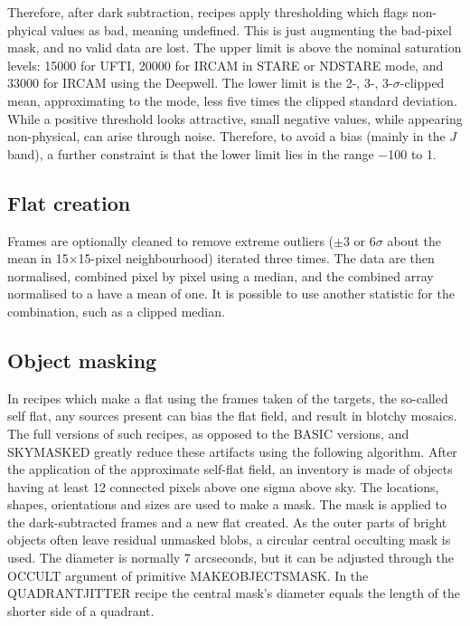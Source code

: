\documentclass[twoside,11pt]{article}
\newcommand{\xlabel}[1]{}
\renewcommand{\_}{\texttt{\symbol{95}}}
\begin{document}
Therefore, after dark subtraction, recipes apply thresholding which
flags non-phyical values as bad, meaning undefined.  This is
just augmenting the bad-pixel mask, and no valid data are lost.  The
upper limit is above the nominal saturation levels: 15000 for UFTI,
20000 for IRCAM in STARE or NDSTARE mode, and 33000 for IRCAM using
the Deepwell.  The lower limit is the 2-, 3-, 3-$\sigma$-clipped mean,
approximating to the mode, less five times the clipped standard
deviation.  While a positive threshold looks attractive, small
negative values, while appearing non-physical, can arise through noise.
Therefore, to avoid a bias (mainly in the $J$ band), a further
constraint is that the lower limit lies in the range $-$100 to 1.  

\subsection{\xlabel{flat_creation}Flat creation\label{flat_creation}}

Frames are optionally cleaned to remove extreme outliers ($\pm$3 or
6$\sigma$ about the mean in 15$\times$15-pixel neighbourhood) iterated
three times.  The data are then normalised, combined pixel by pixel
using a median, and the combined array normalised to a have a mean of
one.  It is possible to use another statistic for the combination,
such as a clipped median.

\subsection{\xlabel{object_masking}Object masking\label{object_masking}}

In recipes which make a flat using the frames taken of the targets,
the so-called self flat, any sources present can bias the flat field, and
result in blotchy mosaics.  The full versions of such recipes, as
opposed to the \_BASIC versions, and SKY\_MASKED greatly reduce these
artifacts using the following algorithm.  After the application of the
approximate self-flat field, an inventory is made of objects having at
least 12 connected pixels above one sigma above sky.  The locations,
shapes, orientations and sizes are used to make a mask.  The mask is
applied to the dark-subtracted frames and a new flat created.  As
the outer parts of bright objects often leave residual unmasked
blobs, a circular central occulting mask is used.  The diameter is
normally 7 arcseconds, but it can be adjusted through the OCCULT argument
of primitive \_MAKE\_OBJECTS\_MASK\_.  In the QUADRANT\_JITTER recipe
the central mask's diameter equals the length of the shorter side
of a quadrant.
\end{document}
